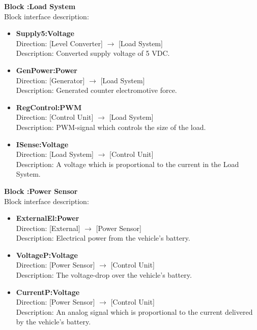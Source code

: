 \textbf{Block :Load System}\\ 
Block interface description:
\begin{itemize}
	\item \textbf{Supply5:Voltage}\\
	Direction: [Level Converter] $\rightarrow$ [Load System]\\
	Description: Converted supply voltage of 5 VDC.
	\item \textbf{GenPower:Power}\\
	Direction: [Generator] $\rightarrow$ [Load System]\\
	Description: Generated counter electromotive force.
	\item \textbf{RegControl:PWM}\\
	Direction: [Control Unit] $\rightarrow$ [Load System]\\
	Description: PWM-signal which controls the size of the load.
	\item \textbf{ISense:Voltage}\\
	Direction: [Load System] $\rightarrow$ [Control Unit]\\
	Description: A voltage which is proportional to the current in the Load System.
\end{itemize}
								
\textbf{Block :Power Sensor}\\
Block interface description:
\begin{itemize}
	\item \textbf{ExternalEl:Power}\\
	Direction: [External] $\rightarrow$ [Power Sensor]\\
	Description: Electrical power from the vehicle's battery.
	\item \textbf{VoltageP:Voltage}\\
	Direction: [Power Sensor] $\rightarrow$ [Control Unit]\\
	Description: The voltage-drop over the vehicle's battery.
	\item \textbf{CurrentP:Voltage}\\
	Direction: [Power Sensor] $\rightarrow$ [Control Unit]\\
	Description: An analog signal which is proportional to the current delivered by the vehicle's battery.
\end{itemize}
									

